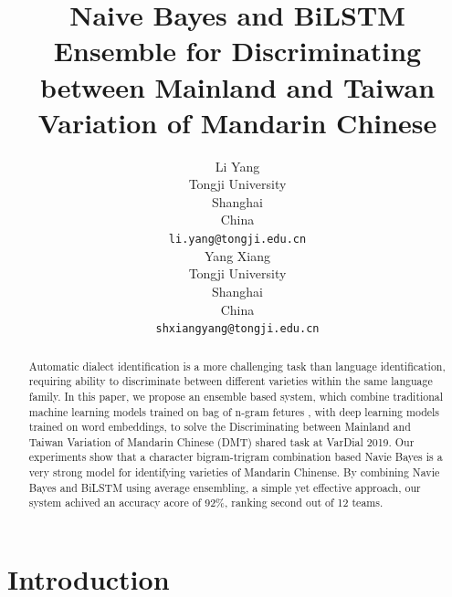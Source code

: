 \documentclass[11pt,a4paper]{article}
\title{Naive Bayes and BiLSTM Ensemble for Discriminating between Mainland and Taiwan Variation of Mandarin Chinese}
\author{Li Yang \\
  Tongji University \\
  Shanghai \\
  China \\
  {\tt li.yang@tongji.edu.cn} \\\And
  Yang Xiang \\
  Tongji University \\
  Shanghai \\
  China \\
  {\tt shxiangyang@tongji.edu.cn} \\}
\date{}
\begin{document}
\maketitle
\begin{abstract}
  Automatic dialect identification is a more challenging task than language identification, requiring ability to discriminate between different varieties within the same language family. In this paper, we propose an ensemble based system, which combine traditional machine learning models trained on bag of n-gram fetures , with deep learning models trained on word embeddings, to solve the Discriminating between Mainland and Taiwan Variation of Mandarin Chinese (DMT) shared task at VarDial 2019. Our experiments show that a character bigram-trigram combination based Navie Bayes is a very strong model for identifying varieties of Mandarin Chinense. By combining Navie Bayes and BiLSTM using average ensembling, a simple yet effective approach, our system achived an accuracy acore of 92\%, ranking second out of 12 teams.
\end{abstract}

\section{Introduction\label{introduction}}
\end{document}
